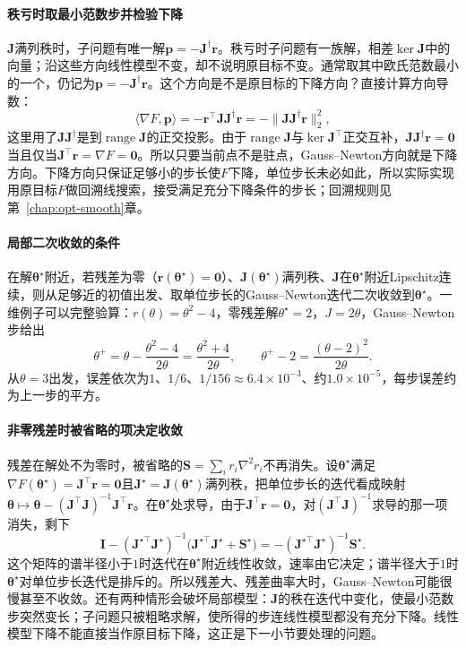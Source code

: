 \paragraph{秩亏时取最小范数步并检验下降}
$\bm J$满列秩时，子问题有唯一解$\bm p=-\bm J^\dagger\bm r$。秩亏时子问题有一族解，相差$\ker\bm J$中的向量；沿这些方向线性模型不变，却不说明原目标不变。通常取其中欧氏范数最小的一个，仍记为$\bm p=-\bm J^\dagger\bm r$。这个方向是不是原目标的下降方向？直接计算方向导数：
\[
  \langle\nabla F,\bm p\rangle=-\bm r^\top\bm J\bm J^\dagger\bm r=-\|\bm J\bm J^\dagger\bm r\|_2^2 ,
\]
这里用了$\bm J\bm J^\dagger$是到$\operatorname{range}\bm J$的正交投影。由于$\operatorname{range}\bm J$与$\ker\bm J^\top$正交互补，$\bm J\bm J^\dagger\bm r=\bm 0$当且仅当$\bm J^\top\bm r=\nabla F=\bm 0$。所以只要当前点不是驻点，Gauss--Newton方向就是下降方向。下降方向只保证足够小的步长使$F$下降，单位步长未必如此，所以实际实现用原目标$F$做回溯线搜索，接受满足充分下降条件的步长；回溯规则见第~\ref{chap:opt-smooth}章。

\paragraph{局部二次收敛的条件}
在解$\bm\theta^\star$附近，若残差为零（$\bm r(\bm\theta^\star)=\bm 0$）、$\bm J(\bm\theta^\star)$满列秩、$\bm J$在$\bm\theta^\star$附近Lipschitz连续，则从足够近的初值出发、取单位步长的Gauss--Newton迭代二次收敛到$\bm\theta^\star$。一维例子可以完整验算：$r(\theta)=\theta^2-4$，零残差解$\theta^\star=2$，$J=2\theta$，Gauss--Newton步给出
\[
  \theta^+=\theta-\frac{\theta^2-4}{2\theta}=\frac{\theta^2+4}{2\theta},\qquad
  \theta^+-2=\frac{(\theta-2)^2}{2\theta}.
\]
从$\theta=3$出发，误差依次为$1$、$1/6$、$1/156\approx6.4\times10^{-3}$、约$1.0\times10^{-5}$，每步误差约为上一步的平方。

\paragraph{非零残差时被省略的项决定收敛}
残差在解处不为零时，被省略的$\bm S=\sum_ir_i\nabla^2r_i$不再消失。设$\bm\theta^\star$满足$\nabla F(\bm\theta^\star)=\bm J^\top\bm r=\bm 0$且$\bm J^\star=\bm J(\bm\theta^\star)$满列秩，把单位步长的迭代看成映射$\bm\theta\mapsto\bm\theta-(\bm J^\top\bm J)^{-1}\bm J^\top\bm r$。在$\bm\theta^\star$处求导，由于$\bm J^\top\bm r=\bm 0$，对$(\bm J^\top\bm J)^{-1}$求导的那一项消失，剩下
\[
  \bm I-(\bm J^{\star\top}\bm J^\star)^{-1}\bigl(\bm J^{\star\top}\bm J^\star+\bm S^\star\bigr)=-(\bm J^{\star\top}\bm J^\star)^{-1}\bm S^\star .
\]
这个矩阵的谱半径小于$1$时迭代在$\bm\theta^\star$附近线性收敛，速率由它决定；谱半径大于$1$时$\bm\theta^\star$对单位步长迭代是排斥的。所以残差大、残差曲率大时，Gauss--Newton可能很慢甚至不收敛。还有两种情形会破坏局部模型：$\bm J$的秩在迭代中变化，使最小范数步突然变长；子问题只被粗略求解，使所得的步连线性模型都没有充分下降。线性模型下降不能直接当作原目标下降，这正是下一小节要处理的问题。


